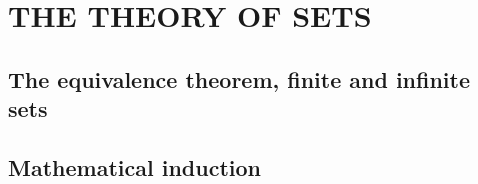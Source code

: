 \chapter{THE THEORY OF SETS}

\section{The equivalence theorem, finite and infinite sets}

\section{Mathematical induction}



